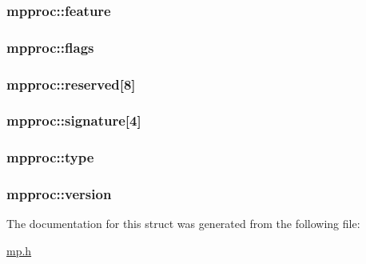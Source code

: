 \subsubsection[{\texorpdfstring{feature}{feature}}]{ mpproc\+::feature}\hypertarget{structmpproc_a62dc15542eee0797a4636b701439b6d9}{}\label{structmpproc_a62dc15542eee0797a4636b701439b6d9}
\subsubsection[{\texorpdfstring{flags}{flags}}]{ mpproc\+::flags}\hypertarget{structmpproc_abac8cdeb6e601ce8e5bf343c8efb3680}{}\label{structmpproc_abac8cdeb6e601ce8e5bf343c8efb3680}
\subsubsection[{\texorpdfstring{reserved}{reserved}}]{ mpproc\+::reserved\mbox{[}8\mbox{]}}\hypertarget{structmpproc_a94bbb1f4794bcf6126fb36520f668134}{}\label{structmpproc_a94bbb1f4794bcf6126fb36520f668134}
\subsubsection[{\texorpdfstring{signature}{signature}}]{ mpproc\+::signature\mbox{[}4\mbox{]}}\hypertarget{structmpproc_a2e18fc2c01b252da2c0d671fdce95eb5}{}\label{structmpproc_a2e18fc2c01b252da2c0d671fdce95eb5}
\subsubsection[{\texorpdfstring{type}{type}}]{ mpproc\+::type}\hypertarget{structmpproc_acd7371100bf5624c8eafe1280826f358}{}\label{structmpproc_acd7371100bf5624c8eafe1280826f358}
\subsubsection[{\texorpdfstring{version}{version}}]{ mpproc\+::version}\hypertarget{structmpproc_a6d7948bc046404527c0eec71e3e93209}{}\label{structmpproc_a6d7948bc046404527c0eec71e3e93209}


The documentation for this struct was generated from the following file\+:\begin{DoxyCompactItemize}
\item 
\hyperlink{mp_8h}{mp.\+h}\end{DoxyCompactItemize}
